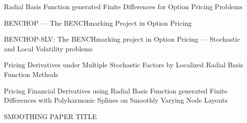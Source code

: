 \documentclass{UUThesisTemplate}
\begin{document}
\frontmatter
    \frontmatterCS

   \dedication{``These violent delights have violent ends''\\(Romeo and Juliet: Act 2, Scene 6, Line 9)}

    \begin{listofpapers}
    	\item Radial Basis Function generated Finite Differences for Option Pricing Problems \label{paper1}
	\item BENCHOP --- The BENCHmarking Project in Option Pricing  \label{paper2}
	\item BENCHOP-SLV: The BENCHmarking project in Option Pricing --- Stochastic and Local Volatility problems \label{paper4}
	\item Pricing Derivatives under Multiple Stochastic Factors by Localized Radial Basis Function Methods \label{paper3}
	\item Pricing Financial Derivatives using Radial Basis Function generated Finite Differences with Polyharmonic Splines on Smoothly Varying Node Layouts \label{paper5}
	\item SMOOTHING PAPER TITLE \label{paper6}
    \end{listofpapers}


    \begingroup
        \tableofcontents
    \endgroup


\mainmatter
%    
%    
%    

%    
%
%
\end{document}
